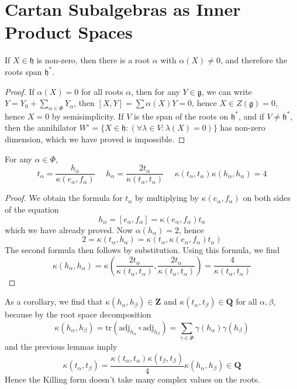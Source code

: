 \section{Cartan Subalgebras as Inner Product Spaces}

\begin{lemma}
    If $X \in \mathfrak{h}$ is non-zero, then there is a root $\alpha$ with $\alpha(X) \neq 0$, and therefore the roots span $\mathfrak{h}^*$.
\end{lemma}
\begin{proof}
    If $\alpha(X) = 0$ for all roots $\alpha$, then for any $Y \in \mathfrak{g}$, we can write $Y = Y_0 + \sum_{\alpha \in \Phi} Y_\alpha$, then $[X,Y] = \sum \alpha(X) Y = 0$, hence $X \in Z(\mathfrak{g}) = 0$, hence $X = 0$ by semisimplicity. If $V$ is the span of the roots on $\mathfrak{h}^*$, and if $V \neq \mathfrak{h}^*$, then the annihilator $W^\circ = \{ X \in \mathfrak{h} : (\forall \lambda \in V: \lambda(X) = 0) \}$ has non-zero dimension, which we have proved is impossible.
\end{proof}

\begin{lemma}
    For any $\alpha \in \Phi$,
    \[ t_\alpha = \frac{h_\alpha}{\kappa(e_\alpha, f_\alpha)}\ \ \ \ \ \ h_\alpha = \frac{2t_\alpha}{\kappa(t_\alpha, t_\alpha)}\ \ \ \ \ \ \kappa(t_\alpha, t_\alpha) \kappa(h_\alpha, h_\alpha) = 4 \]
\end{lemma}
\begin{proof}
    We obtain the formula for $t_\alpha$ by multiplying by $\kappa(e_\alpha, f_\alpha)$ on both sides of the equation
    \[ h_\alpha = [e_\alpha, f_\alpha] = \kappa(e_\alpha, f_\alpha) t_\alpha \]
    which we have already proved. Now $\alpha(h_\alpha) = 2$, hence
    \[ 2 = \kappa(t_\alpha,h_\alpha) = \kappa(t_\alpha, \kappa(e_\alpha,f_\alpha)t_\alpha) \]
    The second formula then follows by substitution. Using this formula, we find
    \[ \kappa (h_\alpha, h_\alpha) = \kappa \left( \frac{2t_\alpha}{\kappa(t_\alpha,t_\alpha)}, \frac{2t_\alpha}{\kappa(t_\alpha,t_\alpha)} \right) = \frac{4}{\kappa(t_\alpha, t_\alpha)} \]
\end{proof}

As a corollary, we find that $\kappa(h_\alpha, h_\beta) \in \mathbf{Z}$ and $\kappa(t_\alpha, t_\beta) \in \mathbf{Q}$ for all $\alpha, \beta$, because by the root space decomposition
%
\[ \kappa(h_\alpha, h_\beta) = \text{tr}(\text{adj}_{h_\alpha} \circ \text{adj}_{h_\beta}) = \sum_{\gamma \in \Phi} \gamma(h_\alpha) \gamma(h_\beta) \]
%
and the previous lemmas imply
%
\[ \kappa(t_\alpha, t_\beta) = \frac{\kappa(t_\alpha, t_\alpha) \kappa(t_\beta, t_\beta)}{4} \kappa(h_\alpha, h_\beta) \in \mathbf{Q} \]
%
Hence the Killing form doesn't take many complex values on the roots.

